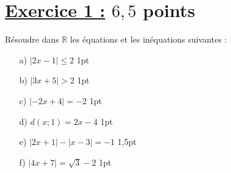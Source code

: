 \documentclass[12pt,a4paper]{article}
\begin{document}
\section*{\underline{Exercice 1 :} $6,5$ points}

\noindent Résoudre dans \( \mathbb{R} \) les équations et les inéquations suivantes : 
\begin{enumerate}
    \item[a)] \( |2x - 1| \leq 2 \) \hfill 1pt
    \item[b)] \( |3x + 5| > 2 \) \hfill 1pt
    \item[c)] \( |-2x + 4| = -2 \) \hfill 1pt
    \item[d)] \( d(x; 1) = 2x - 4 \) \hfill 1pt
    \item[e)] \( |2x + 1| - |x - 3| = -1 \) \hfill 1,5pt
    \item[f)] \( |4x + 7| = \sqrt{3} - 2 \) \hfill 1pt
\end{enumerate}
\end{document}

